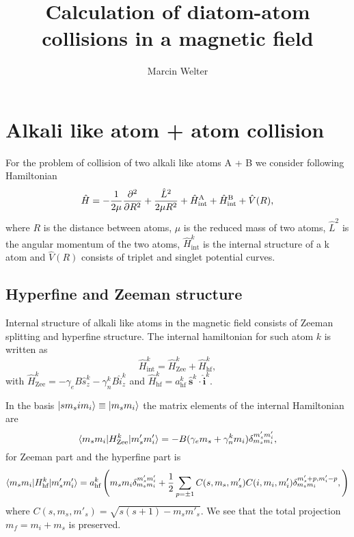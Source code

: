 \documentclass[a4paper]{article}
\title{Calculation of diatom-atom collisions in a magnetic field}
\author{Marcin Welter}
\begin{document}
\maketitle


\section{Alkali like atom + atom collision}
    For the problem of collision of two alkali like atoms A + B we consider following Hamiltonian
    \[
        \hat{H} = -\frac{1}{2\mu}\pdv[order=2]{}{R} + \frac{\hat{L}^2}{2\mu R^2}
            + \hat{H}^\text{A}_\text{int} + \hat{H}^\text{B}_\text{int} + \hat{V}(R),
    \]
    where $R$ is the distance between atoms, $\mu$ is the reduced mass of two atoms, 
    \(\hat{L}^2\) is the angular momentum of the two atoms,
    \(\hat{H}^k_\text{int}\) is the internal structure of a k atom and \(\hat{V}(R)\) 
    consists of triplet and singlet potential curves.

\subsection{Hyperfine and Zeeman structure}
    Internal structure of alkali like atoms in the magnetic field consists of Zeeman splitting and
    hyperfine structure. The internal hamiltonian for such atom $k$ is written as
    \begin{equation}\label{eq:alkali_hamiltonian_int}
        \hat{H}^k_\text{int} = \hat{H}^k_\text{Zee} + \hat{H}^k_\text{hf},
    \end{equation}
    with \(\hat{H}^k_\text{Zee} = -\gamma_e B \hat{s}^k_z - \gamma^k_n B \hat{i}^k_z\) and 
    \(\hat{H}^k_\text{hf} = a^k_\text{hf} \ \hat{\mathbf{s}}^k \cdot \hat{\mathbf{i}}^k\).

    In the basis \(\ket{s m_s i m_i} \equiv \ket{m_s m_i}\) the matrix elements of the internal Hamiltonian are
    \[
        \braket{m_s m_i | H^k_\text{Zee} | m'_s m'_i} = -B(\gamma_e m_s + \gamma^k_n m_i) \delta^{m'_s m'_i}_{m_s m_i},
    \]
    for Zeeman part and the hyperfine part is
    \[
        \braket{m_s m_i | H^k_\text{hf} | m'_s m'_i} = a^k_\text{hf} 
            \left(
                m_s m_i \delta_{m_s m_i}^{m'_s m'_i} 
                + \frac{1}{2}\sum_{p = \pm 1} C(s, m_s, m'_s) C(i, m_i, m'_i)\delta_{m_s m_i}^{m'_s + p, m'_i - p},
            \right)
    \]
    where \(C(s, m_s, m'_s) = \sqrt{s(s + 1) - m_s m'_s}\). 
    We see that the total projection $m_f = m_i + m_s$ is preserved.
\end{document}

